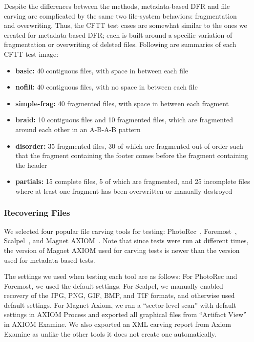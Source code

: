 Despite the differences between the methods, metadata-based DFR and file carving are complicated by the same two file-system behaviors: fragmentation and overwriting. Thus, the CFTT test cases are somewhat similar to the ones we created for metadata-based DFR; each is built around a specific variation of fragmentation or overwriting of deleted files.
Following are summaries of each CFTT test image:
\begin{itemize}
 \item \textbf{basic:} 40 contiguous files, with space in between each file
 \item \textbf{nofill:} 40 contiguous files, with no space in between each file
 \item \textbf{simple-frag:} 40 fragmented files, with space in between each fragment
 \item \textbf{braid:} 10 contiguous files and 10 fragmented files, which are fragmented around each other in an A-B-A-B pattern
 \item \textbf{disorder:} 35 fragmented files, 30 of which are fragmented out-of-order such that the fragment containing the footer comes before the fragment containing the header
 \item \textbf{partials:} 15 complete files, 5 of which are fragmented, and 25 incomplete files where at least one fragment has been overwritten or manually destroyed

\end{itemize}


\subsubsection{Recovering Files}

We selected four popular file carving tools for testing: PhotoRec~\cite{photorec}, Foremost~\cite{foremost}, Scalpel~\cite{scalpel}, and Magnet AXIOM~\cite{axiom_carve}.
Note that since tests were run at different times, the version of Magnet AXIOM used for carving tests is newer than the version used for metadata-based tests.

The settings we used when testing each tool are as follows:
For PhotoRec and Foremost, we used the default settings.
For Scalpel, we manually enabled recovery of the JPG, PNG, GIF, BMP, and TIF formats, and otherwise used default settings.
For Magnet Axiom, we ran a ``sector-level scan'' with default settings in AXIOM Process and exported all graphical files from ``Artifact View'' in AXIOM Examine.
We also exported an XML carving report from Axiom Examine as unlike the other tools it does not create one automatically.

